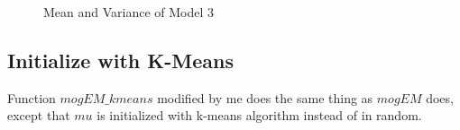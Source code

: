 \documentclass{article}
\begin{document}
\begin{figure}
	\centering
	\quad
	\caption{Mean and Variance of Model 3}
	\label{fig-10}
\end{figure}

\subsection{Initialize with K-Means}
Function $mogEM\_kmeans$ modified by me does the same thing as $mogEM$ does, except that $mu$ is initialized with k-means algorithm instead of in random.
\end{document}
